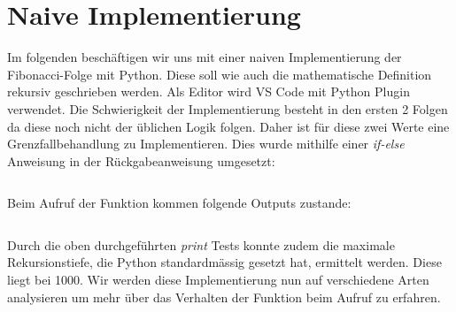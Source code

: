 \section{Naive Implementierung}
Im folgenden beschäftigen wir uns mit einer naiven
Implementierung der Fibonacci-Folge mit Python.
Diese soll wie auch die mathematische Definition rekursiv geschrieben werden.
Als Editor wird VS Code mit Python Plugin verwendet.
Die Schwierigkeit der Implementierung besteht in den
ersten 2 Folgen da diese noch nicht der üblichen Logik folgen.
Daher ist für diese zwei Werte eine Grenzfallbehandlung
zu Implementieren. Dies wurde mithilfe einer \textit{if-else}
Anweisung in der Rückgabeanweisung umgesetzt:
\begin{mdframed}[backgroundcolor=bg]
    \inputminted{Python}{src/naive_fibonacci.py}
\end{mdframed}
Beim Aufruf der Funktion kommen folgende Outputs zustande:
\begin{mdframed}[backgroundcolor=bg]
    \inputminted{Python}{src/naive_fibonacci_test.py}
\end{mdframed}
Durch die oben durchgeführten \textit{print} Tests konnte
zudem die maximale Rekursionstiefe, die Python standardmässig
gesetzt hat, ermittelt werden. 
Diese liegt bei 1000. 
Wir werden diese Implementierung nun
auf verschiedene Arten analysieren um mehr über das 
Verhalten der Funktion beim Aufruf zu erfahren.

